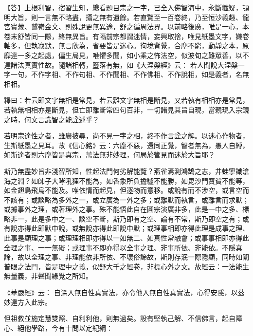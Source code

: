 【答】上根利智，宿習生知，纔看題目{\kaishu 宗}之一字，已全入佛智海中，永斷纖疑，頓明大旨，則一言無不略盡，攝之無有遺餘。若直覽至一百卷終，乃至恒沙義趣、龍宮寶藏、鷲嶺金文、則殊說更無異途，舒之徧周法界。以前略後廣，唯是一心，本卷末舒皆同一際，終無異旨。有隔前宗都謂迷情，妄興取捨，唯見紙墨文字，嫌卷軸多，但執寂默，無言欣為，省要皆是迷心。徇境背覺，合塵不窮，動靜之本，原靡達一多之起處，偏生局見，唯懼多聞，如小乘之怖法空，似波旬之難眾善，以不達諸法真實性故。隨諸相轉，墮落有無，如《大涅槃經》云： {\kaishu 若人聞說大涅槃一字一句，不作字相、不作句相、不作聞相、不作佛相、不作說相，如是義者，名無相相}。

釋曰：若云即文字無相是常見，若云離文字無相是斷見，又若執有相相亦是常見，若執無相相亦是斷見，但亡即離斷常四句百非，一切諸見其旨自現，當親現入宗鏡之時，何文言識智之能詮述乎？

若明宗達性之者，雖廣披尋，尚不見一字之相，終不作言詮之解。以迷心作物者，生斯紙墨之見耳。故《信心銘》云：{\kaishu 六塵不惡，還同正覺，智者無為，愚人自縛}，如斯達者則六塵皆是真宗，萬法無非妙理，何局於管見而迷於大旨耶？

斯乃無盡妙旨非淺智所知，性起法門何劣解能覽？燕雀焉測鴻鵠之志，井蛙寧識滄海之淵？如師子大哮吼狸不能為，如香象所負擔驢不能勝，如毘沙門寶貧不能等，如金翅鳥飛烏不能及。唯依情而起見，但逐物而意移。或說有而不涉空，或言空而不該有；或談略為多外之一，或立廣為一外之多；或離默而執言，或離言而求默；或據事外之理，或著理外之事。殊不能悟此自在圓宗演廣非多，此是一中之多、標略非一，此是多中之一、談空不斷，斯乃即有之空、論有不常，斯乃即空之有；或有說亦得此即默中說，或無說亦得此即說中默；或理事相即亦得此理是成事之理、此事是顯理之事；或理理相即亦得以一如無二、如真性常融會；或事事相即亦得此全理之事、一一無礙；或理事不即亦得以全事之理、非事所依、非能依。不隱真諦，故以全理之事、非理能依非所依、不壞俗諦故，斯則存泯一際隱顯，同時如闡普眼之法門，皆是理中之義，似舒大千之經卷，非標心外之文。故經云：{\kaishu 一法能生無量義，非聲聞緣覺之所知}。

《華嚴經》云： {\kaishu 自深入無自性真實法，亦令他入無自性真實法，心得安隱}，以茲妙達方入此宗。

但祖教並施定慧雙照、自利利他，則無過矣。設有堅執己解、不信佛言，起自障心、絕他學路，今有十問以定紀綱：

